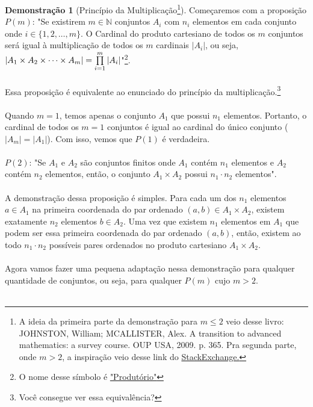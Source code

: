 \documentclass[a4paper,11pt,oneside]{book}
\theoremstyle{definition}
\theoremstyle{break}
\newtheorem{demonstration}{Demonstração}[section]
\begin{document}
\begin{demonstration}[Princípio da Multiplicação\footnote{A ideia da primeira parte da demonstração para $m \leq 2$ veio desse livro: JOHNSTON, William; MCALLISTER, Alex. A transition to advanced mathematics: a survey course. OUP USA, 2009. p. 365. Pra segunda parte, onde $m > 2$, a inspiração veio desse link do 
\href{https://math.stackexchange.com/questions/3053969/using-induction-to-prove-the-multiplication-rule}{StackExchange.}}]

Começaremos com a proposição $P(m)$: "Se existirem $m \in \mathbb{N}$ conjuntos $A_i$ com $n_i$ elementos em cada conjunto onde $i \in \{1,2,\dots,m\}$. O Cardinal do produto cartesiano de todos os $m$ conjuntos será igual à multiplicação de todos os $m$ cardinais $| A_i|$, ou seja, $ |A_1 \times A_2 \times \dots \times A_m | = \prod_{i = 1}^{m}\limits | A_i | $"\footnote{O nome desse símbolo é \href{https://en.wikipedia.org/wiki/Multiplication\#Product_of_a_sequence}{"Produtório"}}.
\\
\\
Essa proposição é equivalente ao enunciado do princípio da multiplicação.\footnote{Você consegue ver essa equivalência?}
\\
\\
Quando $m = 1$, temos apenas o conjunto $A_1$ que possui $n_1$ elementos. Portanto, o cardinal de todos os $m = 1$ conjuntos é igual ao cardinal do único conjunto ($|A_m| = |A_1|$). Com isso, vemos que $P(1)$ é verdadeira.
\\
\\
$P(2)$: "Se $A_1$ e $A_2$ são conjuntos finitos onde $A_1$ contém $n_1$ elementos e $A_2$ contém $n_2$ elementos, então, o conjunto $A_1 \times A_2$ possui $n_1 \cdot n_2$ elementos".
\\
\\
A demonstração dessa proposição é simples. Para cada um dos $n_1$ elementos $a \in A_1$ na primeira coordenada do par ordenado $(a,b) \in A_1 \times A_2$, existem exatamente $n_2$ elementos $b \in A_2$. Uma vez que existem $n_1$ elementos em $A_1$ que podem ser essa primeira coordenada do par ordenado $(a,b)$, então, existem ao todo $n_1 \cdot n_2$ possíveis pares ordenados no produto cartesiano $A_1 \times A_2$.
\\
\\
Agora vamos fazer uma pequena adaptação nessa demonstração para qualquer quantidade de conjuntos, ou seja, para qualquer $P(m)$ cujo $m > 2$.
\\
\\

\end{demonstration}
\end{document}
